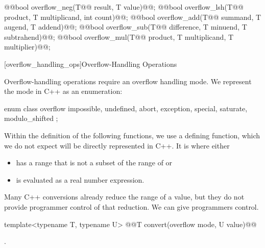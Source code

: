 \begin{addedblock}
\begin{codeblock}
@@bool overflow_neg(T@\tcode{\remmodif{*}\addmodif{\&}}@ result, T value)@@;
@@bool overflow_lsh(T@\tcode{\remmodif{*}\addmodif{\&}}@ product, T multiplicand, int count)@@;
@@bool overflow_add(T@\tcode{\remmodif{*}\addmodif{\&}}@ summand, T augend, T addend)@@;
@@bool overflow_sub(T@\tcode{\remmodif{*}\addmodif{\&}}@ difference, T minuend, T subtrahend)@@;
@@bool overflow_mul(T@\tcode{\remmodif{*}\addmodif{\&}}@ product, T multiplicand, T multiplier)@@;
\end{codeblock}

[overflow_handling_ops]{Overflow-Handling Operations}

Overflow-handling operations require an overflow handling mode. We represent the mode in C++ as an enumeration:

\begin{codeblock}
enum class overflow {
	impossible, undefined, abort, exception,
	special,
	saturate, modulo_shifted
};
\end{codeblock}

Within the definition of the following functions, we use a defining function, which we do not expect will be directly represented in C++. It is  where  either
\begin{itemize}
\item has a range that is not a subset of the range of  or
\item is evaluated as a real number expression.
\end{itemize}

Many C++ conversions already reduce the range of a value, but they do not provide programmer control of that reduction. We can give programmers control.

\begin{itemdecl}
template<typename T, typename U> @@T convert(overflow mode, U value)@\addmodif{;}@
\end{itemdecl}

\begin{itemdescr}
\returns {}.	
\end{itemdescr}


\end{addedblock}
